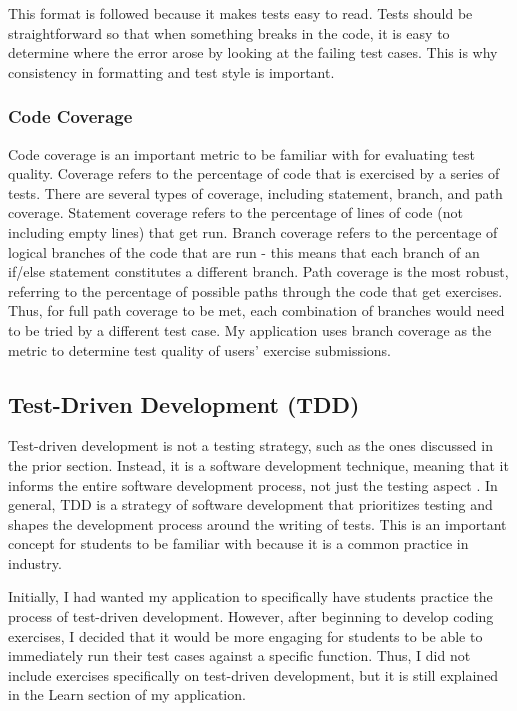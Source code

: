 \documentclass[10pt,twocolumn]{article}
\begin{document}
This format is followed because it makes tests easy to read. Tests should be straightforward so that when something breaks 
in the code, it is easy to determine where the error arose by looking at the failing test cases. This is why consistency in
formatting and test style is important. 

\subsubsection{Code Coverage}

Code coverage is an important metric to be familiar with for evaluating test quality. Coverage refers to the percentage 
of code that is exercised by a series of tests. There are several types of coverage, including statement, branch, and path 
coverage. Statement coverage refers to the percentage of lines of code (not including empty lines) that get run. Branch
coverage refers to the percentage of logical branches of the code that are run - this means that each branch of an if/else 
statement constitutes a different branch. Path coverage is the most robust, referring to the percentage of possible paths 
through the code that get exercises. Thus, for full path coverage to be met, each combination of branches would need to be 
tried by a different test case. My application uses branch coverage as the metric to determine test quality of users' 
exercise submissions.

\subsection{Test-Driven Development (TDD)}

Test-driven development is not a testing strategy, such as 
the ones discussed in the prior section. Instead, it is a software development technique, meaning
that it informs the entire software development process, not just the testing aspect \cite{George2004Article}. In general,
TDD is a strategy of software development that prioritizes testing and shapes the development process around the writing 
of tests. This is an important concept for students to be familiar with because it is a common practice in industry. 

Initially, I had wanted my application to specifically have students practice the process of test-driven development. 
However, after beginning to develop coding exercises, I decided that it would be more engaging for students to be able to 
immediately run their test cases against a specific function. Thus, I did not include exercises specifically on test-driven
development, but it is still explained in the Learn section of my application. 
\end{document}
